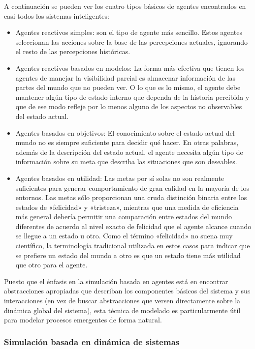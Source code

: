 A continuación se pueden ver los cuatro tipos básicos de agentes encontrados en casi todos los sistemas inteligentes:
\begin{itemize}
	\item Agentes reactivos simples: son el tipo de agente más sencillo. Estos agentes seleccionan las acciones sobre la base de las percepciones actuales, ignorando el resto de las percepciones históricas.
	\item Agentes reactivos basados en modelos: La forma más efectiva que tienen los agentes de manejar la visibilidad parcial es almacenar información de las partes del mundo que no pueden ver. O lo que es lo mismo, el agente debe mantener algún tipo de estado interno que dependa de la historia percibida y que de ese modo refleje por lo menos alguno de los aspectos no observables del estado actual.
	\item Agentes basados en objetivos: El conocimiento sobre el estado actual del mundo no es siempre suficiente para decidir qué hacer. En otras palabras, además de la descripción del estado actual, el agente necesita algún tipo de información sobre su meta que describa las situaciones que son deseables.
	\item Agentes basados en utilidad: Las metas por sí solas no son realmente suficientes para generar comportamiento de gran calidad en la mayoría de los entornos. Las metas sólo proporcionan una cruda distinción binaria entre los estados de «felicidad» y «tristeza», mientras que una medida de eficiencia más general debería permitir una comparación entre estados del mundo diferentes de acuerdo al nivel exacto de felicidad que el agente alcance cuando se llegue a un estado u otro. Como el término «felicidad» no suena muy científico, la terminología tradicional utilizada en estos casos para indicar que se prefiere un estado del mundo a otro es que un estado tiene más utilidad que otro para el agente. \parencite{russell2004inteligencia}
\end{itemize}
Puesto que el énfasis en la simulación basada en agentes está en encontrar abstracciones apropiadas que describan los componentes básicos del sistema y sus interacciones (en vez de buscar abstracciones que versen directamente sobre la dinámica global del sistema), esta técnica de modelado es particularmente útil para modelar procesos emergentes de forma natural.\parencite{izquierdo2008modelado}

\subsubsection{Simulación basada en dinámica de sistemas}

